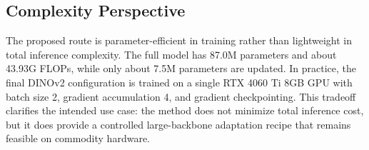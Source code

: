 \subsection{Complexity Perspective}

The proposed route is parameter-efficient in training rather than lightweight in total inference complexity. The full model has 87.0M parameters and about 43.93G FLOPs, while only about 7.5M parameters are updated. In practice, the final DINOv2 configuration is trained on a single RTX 4060 Ti 8GB GPU with batch size 2, gradient accumulation 4, and gradient checkpointing. This tradeoff clarifies the intended use case: the method does not minimize total inference cost, but it does provide a controlled large-backbone adaptation recipe that remains feasible on commodity hardware.
